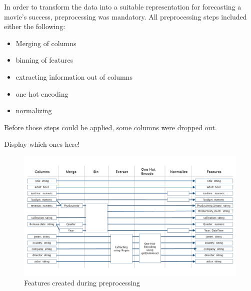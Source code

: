 In order to transform the data into a suitable representation for forecasting a movie's success, preprocessing was mandatory. All preprocessing steps included either the following:
\begin{itemize}
	\item Merging of columns
	\item binning of features
	\item extracting information out of columns
	\item one hot encoding
	\item normalizing
\end{itemize}

Before those steps could be applied, some columns were dropped out.

Display which ones here!


\begin{figure}
\includegraphics[width=\textwidth]{images/3_features.png}
\caption{Features created during preprocessing}
\label{img:features}
\end{figure}


